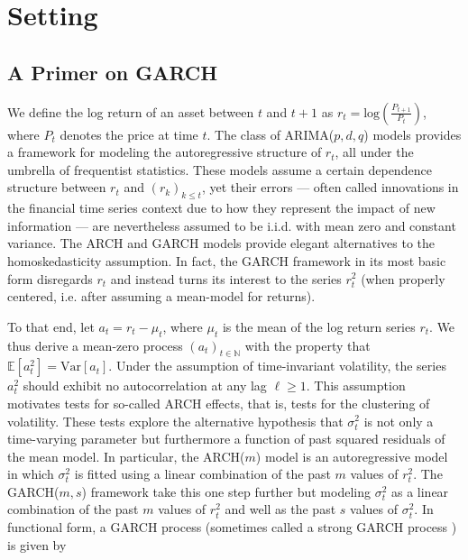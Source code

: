 \documentclass[11pt,3p,review,authoryear]{elsarticle}
\def\mrm#1{\mathrm{#1}} %
\def\E{\mathbb{E}} %
\theoremstyle{definition}
\begin{document}
\section{Setting}
\label{section2}

\subsection{A Primer on GARCH}
We define the log return of an asset between $t$ and $t+1$ as $r_{t} = \text{log}(\frac{P_{t+1}}{P_{t}})$, where $P_{t}$ denotes the price at time $t$.  The class of ARIMA($p,d,q$) models  \citep{box2013box} provides a framework for modeling the autoregressive structure of $r_{t}$, all under the umbrella of frequentist statistics.  These models assume a certain dependence structure between $r_{t}$ and $(r_{k})_{k\leq t}$, yet their errors --- often called innovations in the financial time series context due to how they represent the impact of new information --- are nevertheless assumed to be i.i.d. with mean zero and constant variance.  The ARCH \citep{engle1982autoregressive} and GARCH \citep{bollerslev1986generalized} models provide elegant alternatives to the homoskedasticity assumption.  In fact, the GARCH framework in its most basic form disregards $r_{t}$ and instead turns its interest to the series $r_{t}^{2}$ (when properly centered, i.e. after assuming a mean-model for returns).  

To that end, let $a_{t} = r_{t} - \mu_{t}$, where $\mu_{t}$ is the mean of the log return series $r_{t}$.  We thus derive a mean-zero process $(a_{t})_{t\in\mathbb{N}}$ with the property that $\E[a^{2}_{t}] = \mrm{Var}[a_{t}]$.  Under the assumption of time-invariant volatility, the series $a_{t}^{2}$ should exhibit no autocorrelation at any lag $\ell\geq1$.  This assumption motivates tests for so-called ARCH effects, that is, tests for the clustering of volatility.  These tests explore the alternative hypothesis that $\sigma_{t}^{2}$ is not only a time-varying parameter but furthermore a function of past squared residuals of the mean model.  In particular, the ARCH($m$) model is an autoregressive model in which $\sigma_{t}^{2}$ is fitted using a linear combination of the past $m$ values of $r_{t}^{2}$.  The GARCH($m,s$) framework take this one step further but modeling $\sigma_{t}^{2}$ as a linear combination of the past $m$ values of $r_{t}^{2}$ and well as the past $s$ values of $\sigma_{t}^{2}$.  In functional form, a GARCH process (sometimes called a strong GARCH process \citep[p. 19]{francq2019garch}) is given by
\end{document}
